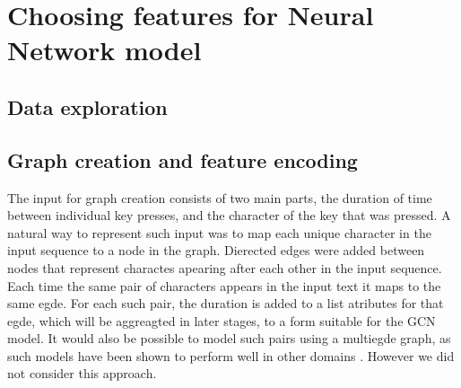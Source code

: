 
\section{Choosing features for Neural Network model}


\subsection{Data exploration}

\subsection{Graph creation and feature encoding}
The input for graph creation consists of two main parts, the duration of time between individual key presses, and the character of the key that was pressed.
A natural way to represent such input was to map each unique character in the input sequence to a node in the graph. 
Dierected edges were added between nodes that represent charactes apearing after each other in the input sequence. 
Each time the same pair of characters appears in the input text it maps to the same egde. For each such pair, the duration is added to a list atributes for that egde, which will be aggreagted in later stages, to a form suitable for the GCN model. It would also be possible to model such pairs using a multiegde graph, as such models have been shown to perform well in other domains . However we did not consider this approach. 

\\

